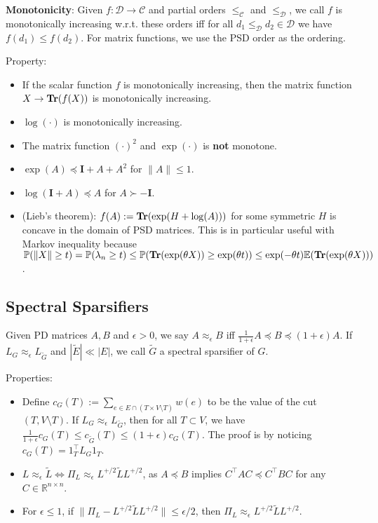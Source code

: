 \textbf{Monotonicity}: Given $f: \mathcal{D} \rightarrow \mathcal{C}$ and partial orders $\le_{\mathcal{C}}$ and $\le_{\mathcal{D}}$, we call $f$ is monotonically increasing w.r.t. these orders iff for all $d_1 \le_{\mathcal{D}} d_2 \in \mathcal{D}$ we have $f(d_1) \le f(d_2)$. For matrix functions, we use the PSD order as the ordering.

Property:
\begin{itemize}
    \item If the scalar function $f$ is monotonically increasing, then the matrix function $X \rightarrow \operatorname{\textbf{Tr}}(f(X))$ is monotonically increasing.
    \item $\log(\cdot)$ is monotonically increasing.
    \item The matrix function $(\cdot)^2$ and $\exp(\cdot)$ is \textbf{not} monotone.
    \item $\exp(A) \preceq \boldsymbol{I} + A + A^2$ for $\|A\| \le 1$.
    \item $\log(\boldsymbol{I}+A) \preceq A$ for $A \succ -\boldsymbol{I}$.
    \item (Lieb's theorem): $f(A):= \operatorname{\textbf{Tr}}(\exp(H+\log(A)))$ for some symmetric $H$ is concave in the domain of PSD matrices. This is in particular useful with Markov inequality because $\mathbb{P}(\|X\| \ge t) = \mathbb{P}(\lambda_n \ge t) \le \mathbb{P}(\operatorname{\textbf{Tr}}(\exp(\theta X)) \ge \exp(\theta t)) \le \exp(-\theta t)\mathbb{E}(\operatorname{\textbf{Tr}}(\exp(\theta X)))$.
\end{itemize}

\subsection{Spectral Sparsifiers}

Given PD matrices $A, B$ and $\epsilon>0$, we say $A \approx_{\epsilon} B$ iff $\frac{1}{1+\epsilon} A \preceq B \preceq (1+\epsilon) A$. If $L_G \approx_{\epsilon} L_{\tilde{G}}$ and $|\tilde{E}| \ll |E|$, we call $\tilde{G}$ a spectral sparsifier of $G$.

Properties:
\begin{itemize}
    \item Define $c_G(T) := \sum_{e \in E \cap (T\times V\setminus T)} w(e)$ to be the value of the cut $(T, V\setminus T)$. If $L_G \approx_{\epsilon} L_{\tilde{G}}$, then for all $T \subset V$, we have $\frac{1}{1+\epsilon} c_G(T) \le c_{\tilde{G}}(T) \le (1+\epsilon) c_G(T)$. The proof is by noticing $c_G(T) = 1_T^\top L_G 1_T$.
    \item $L \approx_{\epsilon} \tilde{L} \Leftrightarrow \Pi_L \approx_\epsilon L^{+/2} \tilde{L} L^{+/2}$, as $A \preceq B$ implies $C^\top A C \preceq C^\top B C$ for any $C\in \mathbb{R}^{n\times n}$.
    \item For $\epsilon \le 1$, if $\|\Pi_L - L^{+/2} \tilde{L} L^{+/2}\| \le \epsilon/2$, then $\Pi_L \approx_\epsilon L^{+/2} \tilde{L} L^{+/2}$.
\end{itemize}

